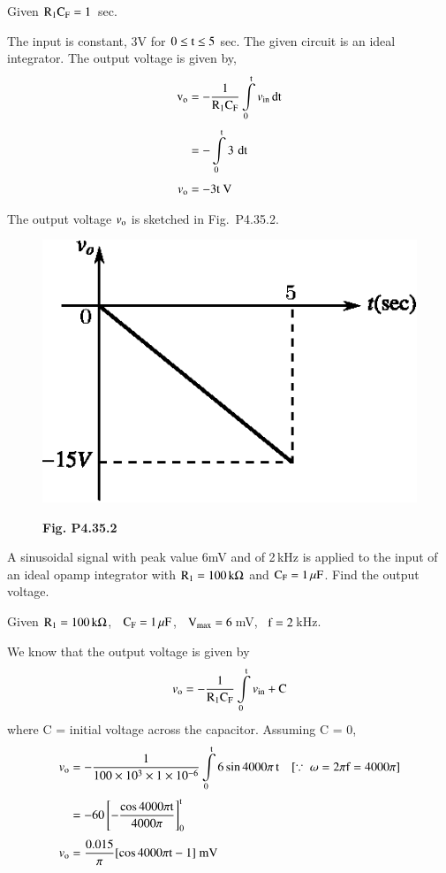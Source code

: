 \begin{solution}
Given $\textrm{R}_{1}\textrm{C}_{\textrm{F}}=1$~sec.
\smallskip

The input is constant, 3V for $0\leq \textrm{t}\leq 5$ sec. The given circuit is an ideal integrator. The output voltage is given by,
\begin{align*}
\textrm{v}_{\textrm{o}} &= -\frac{1}{\textrm{R}_{1}\textrm{C}_{\textrm{F}}}\int\limits^{\textrm{t}}_{0}v_{\text{in}}\operatorname{dt}\\[3pt]
&= -\int\limits^{\textrm{t}}_{0}3\,\operatorname{dt}\\[3pt]
v_{\textrm{o}} &= -3\textrm{t} \ \textrm{V}
\end{align*}

The output voltage $v_{\textrm{o}}$ is sketched in Fig.~P4.35.2.
\begin{figure}[H]
\centering
\includegraphics{chap4/figP4.34.2.eps}

\smallskip
{\bf Fig. P4.35.2}
\end{figure}
\end{solution}

\begin{problem}\label{prob4.36}
A sinusoidal signal with peak value 6mV and of 2\,kHz is applied to the input of an ideal opamp integrator with $\textrm{R}_{1}=100\,\textrm{k}\Omega$ and $\textrm{C}_{\textrm{F}}=1\,\mu\textrm{F}$. Find the output voltage.
\end{problem}

\begin{solution}
Given $\textrm{R}_{1}=100\,\textrm{k}\Omega$, \ $\textrm{C}_{\textrm{F}}=1\,\mu\textrm{F}$, \ $\textrm{V}_{\max}=6$\,mV, \ $\textrm{f}=2$\,kHz.

We know that the output voltage is given by
$$
v_{\textrm{o}}=-\frac{1}{\textrm{R}_{1}\textrm{C}_{\textrm{F}}}\int\limits^{\textrm{t}}_{0}v_{\text{in}}+\textrm{C}
$$
where C = initial voltage across the capacitor. Assuming C = 0,
\begin{align*}
v_{\rmo} &= -\frac{1}{100\times 10^{3}\times 1\times 10^{-6}}\int\limits^{\rmt}_{0}6\sin 4000 \pi\,\rmt\quad [\because \ \omega=2\pi\rmf=4000\pi]\\[3pt]
&=-60\left[-\frac{\cos 4000\pi \rmt}{4000\pi}\right]^{\rmt}_{0}\\[3pt]
v_{\rmo} &= \frac{0.015}{\pi}[\cos 4000 \pi\rmt-1]\text{~mV}
\end{align*}
\end{solution}

